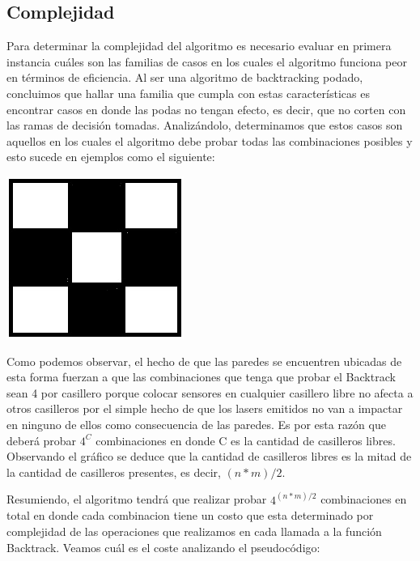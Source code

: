 \subsection{Complejidad}
Para determinar la complejidad del algoritmo es necesario evaluar en primera instancia cuáles son las familias de casos en los cuales el algoritmo funciona peor en términos de eficiencia. Al ser una algoritmo de backtracking podado, concluimos que hallar una familia que cumpla con estas características es encontrar casos en donde las podas no tengan efecto, es decir, que no corten con las ramas de decisión tomadas. Analizándolo, determinamos que estos casos son aquellos en los cuales el algoritmo debe probar todas las combinaciones posibles y esto sucede en ejemplos como el siguiente:

\includegraphics[scale=0.5]{ej3/imgs/ajedrezDibujo.png}

Como podemos observar, el hecho de que las paredes se encuentren ubicadas de esta forma fuerzan a que las combinaciones que tenga que probar el Backtrack sean 4 por casillero porque colocar sensores en cualquier casillero libre no afecta a otros casilleros por el simple hecho de que los lasers emitidos no van a impactar en ninguno de ellos como consecuencia de las paredes. Es por esta razón que deberá probar $4^C$ combinaciones en donde C es la cantidad de casilleros libres. Observando el gráfico se deduce que la cantidad de casilleros libres es la mitad de la cantidad de casilleros presentes, es decir, $(n*m)/2$.

Resumiendo, el algoritmo tendrá que realizar probar $4^{(n*m)/2}$ combinaciones en total en donde cada combinacion tiene un costo que esta determinado por complejidad de las operaciones que realizamos en cada llamada a la función Backtrack. Veamos cuál es el coste analizando el pseudocódigo:

